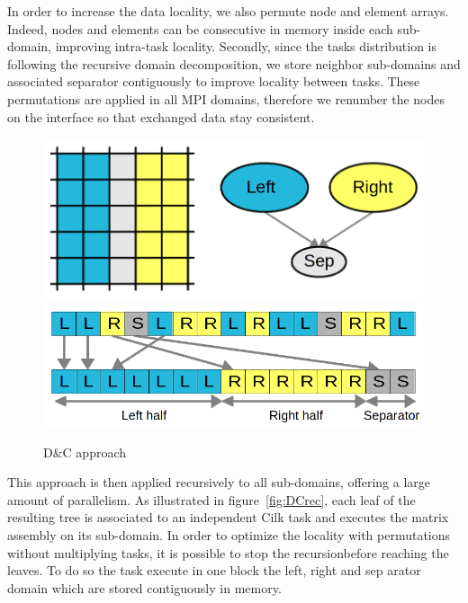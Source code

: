 \documentclass{IOS-Book-Article}
\begin{document}
In order to increase the data locality, we also permute node and element arrays.
Indeed, nodes and elements can be consecutive in memory inside each sub-domain, improving intra-task locality.
Secondly, since the tasks distribution is following the recursive domain decomposition, we store neighbor sub-domains and associated separator contiguously
to improve locality between tasks.
These permutations are applied in all MPI domains, therefore we renumber the nodes on the interface so that exchanged data stay consistent.
\begin{figure}[htp]
 \centering
 \includegraphics[scale=0.17]{DC_approach.png}
 \includegraphics[scale=0.21]{Data_permutations.png}
 \caption{D\&C approach}
 \label{fig:DCapp}
\end{figure}

This approach is then applied recursively to all sub-domains, offering a large amount of parallelism.
As illustrated in figure~\ref{fig:DCrec}, each leaf of the resulting tree is associated to an independent Cilk task and executes the matrix assembly on its sub-domain.
In order to optimize the locality with permutations without multiplying tasks, it is possible to stop the recursionbefore reaching the leaves. To do so the task execute in one block the left, right and sep arator domain which are stored contiguously in memory.
\end{document}
